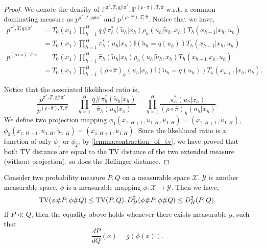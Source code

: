 \documentclass{article}
\begin{document}
\begin{proof}
    We denote the density of $\mathbb P^{\pi^*, T, q\#\pi^*},\mathbb P^{(\rho\circ \hat \pi), T, \hat \pi}$ w.r.t. a common dominating measure as $p^{\pi^*, T, q\#\pi^*}$ and $p^{(\rho\circ \hat \pi), T, \hat \pi}$. Notice that we have,
    \begin{align*}
        p^{\pi^*, T, q\#\pi^*}&=T_0(x_1)\prod_{h=1}^H q\#\pi_h^*(\tilde u_h|x_h)\rho_h(u_h|\tilde u_h,x_h)T_h(x_{h+1}|x_h, u_h)\\
        &=T_0(x_1)\prod_{h=1}^H \pi_h^*(u_h|x_h)\mathbb I(\tilde u_h=q(u_h))T_h(x_{h+1}|x_h,u_h)\\
        p^{(\rho \circ \hat \pi), T,\hat \pi}&=T_0(x_1)\prod_{h=1}^H \hat \pi_h(\tilde u_h|x_h)\rho_h( u_h|\tilde u_h,x_h)T_h(x_{h+1}|x_h, u_h)\\
        &=T_0(x_1)\prod_{h=1}^H (\rho\circ \hat \pi)_h(u_h|x_h)\mathbb I(\tilde u_h=q(u_h))T_h(x_{h+1}|x_h,u_h).
    \end{align*}

    
    Notice that the associated likelihood ratio is,
    \begin{equation*}
        \frac{p^{\pi^*, T, q\#\pi^*}}{p^{(\rho\circ \hat \pi), T,\hat \pi}}=\prod_{h=1}^H \frac{q\#\pi^*_h(\tilde u_h|x_h)}{\hat \pi_h(\tilde u_h|x_h)}=\prod_{h=1}^H\frac{\pi^*_h(u_h|x_h)}{(\rho\circ\hat \pi)_h(u_h|x_h)}.
    \end{equation*}
    We define two projection mapping $\phi_1(x_{1:H+1},u_{1:H},\tilde u_{1:H})=(x_{1:H+1},u_{1:H})$, $\phi_2(x_{1:H+1},u_{1:H},\tilde u_{1:H})=(x_{1:H+1}, \tilde u_{1:H})$. Since the likelihood ratio is a function of only $\phi_1$ or $\phi_2$, by \cref{lemma:contraction_of_tv}, we have proved that both TV distance are equal to the TV distance of the two extended measure (without projection), so does the Hellinger distance. 
\end{proof}

\begin{lemma}\label{lemma:contraction_of_tv}
    Consider two probability measure $P, Q$ on a measurable space $\mathcal X$. $\mathcal Y$ is another measurable space,  $\phi$ is a measurable mapping $\phi:\mathcal X\rightarrow \mathcal Y$. Then we have,
    \begin{equation*}
        \textnormal{TV}(\phi\# P, \phi\# Q)\leq \textnormal{TV}(P,Q), D_H^2(\phi\#P, \phi\#Q)\leq D_H^2(P,Q).
    \end{equation*}
    If $P\ll Q$, then the equality above holds whenever there exists measurable $g$, such that
    \begin{equation*}
        \frac{dP}{dQ}(x)=g(\phi(x)).
    \end{equation*}
\end{lemma}
\end{document}
